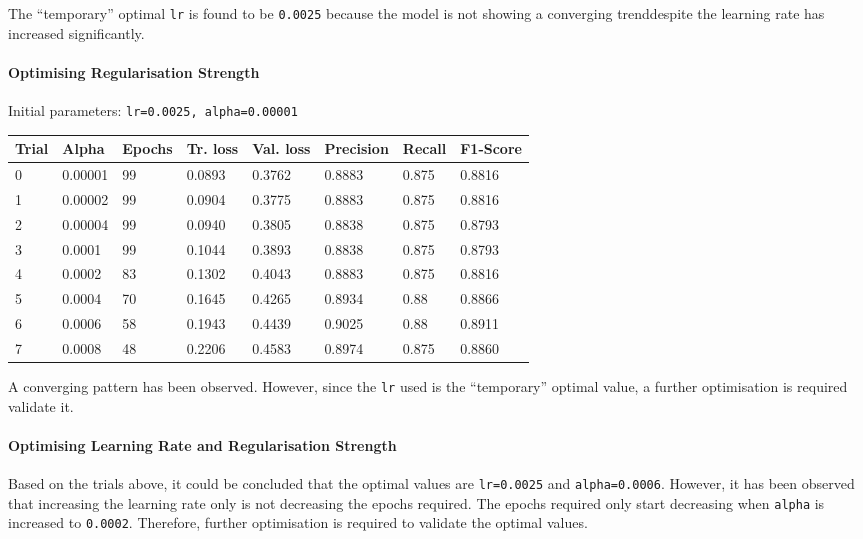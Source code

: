 \documentclass[11pt]{article}
\begin{document}
The ``temporary'' optimal \texttt{lr} is found to be \texttt{0.0025}
because the model is not showing a converging trenddespite the learning
rate has increased significantly.

\hypertarget{optimising-regularisation-strength-1}{%
\paragraph{Optimising Regularisation
Strength}\label{optimising-regularisation-strength-1}}

Initial parameters: \texttt{lr=0.0025,\ alpha=0.00001}

\begin{longtable}[]{@{}llllllll@{}}
\toprule
Trial & Alpha & Epochs & Tr. loss & Val. loss & Precision & Recall &
F1-Score\tabularnewline
\midrule
\endhead
0 & 0.00001 & 99 & 0.0893 & 0.3762 & 0.8883 & 0.875 &
0.8816\tabularnewline
1 & 0.00002 & 99 & 0.0904 & 0.3775 & 0.8883 & 0.875 &
0.8816\tabularnewline
2 & 0.00004 & 99 & 0.0940 & 0.3805 & 0.8838 & 0.875 &
0.8793\tabularnewline
3 & 0.0001 & 99 & 0.1044 & 0.3893 & 0.8838 & 0.875 &
0.8793\tabularnewline
4 & 0.0002 & 83 & 0.1302 & 0.4043 & 0.8883 & 0.875 &
0.8816\tabularnewline
5 & 0.0004 & 70 & 0.1645 & 0.4265 & 0.8934 & 0.88 &
0.8866\tabularnewline
6 & 0.0006 & 58 & 0.1943 & 0.4439 & 0.9025 & 0.88 &
0.8911\tabularnewline
7 & 0.0008 & 48 & 0.2206 & 0.4583 & 0.8974 & 0.875 &
0.8860\tabularnewline
\bottomrule
\end{longtable}

A converging pattern has been observed. However, since the \texttt{lr}
used is the ``temporary'' optimal value, a further optimisation is
required validate it.

\hypertarget{optimising-learning-rate-and-regularisation-strength}{%
\paragraph{Optimising Learning Rate and Regularisation
Strength}\label{optimising-learning-rate-and-regularisation-strength}}

Based on the trials above, it could be concluded that the optimal values
are \texttt{lr=0.0025} and \texttt{alpha=0.0006}. However, it has been
observed that increasing the learning rate only is not decreasing the
epochs required. The epochs required only start decreasing when
\texttt{alpha} is increased to \texttt{0.0002}. Therefore, further
optimisation is required to validate the optimal values.
\end{document}
